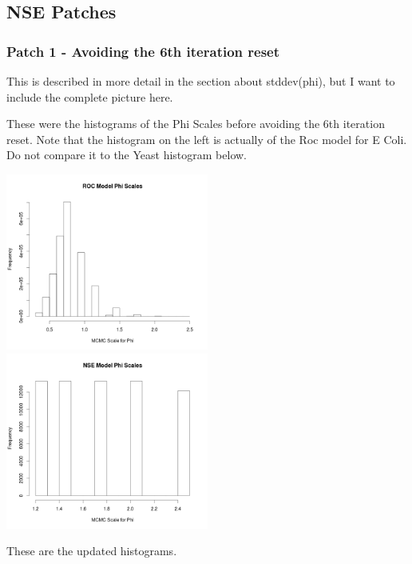 \subsection{NSE Patches}

\subsubsection{Patch 1 - Avoiding the 6th iteration reset}

This is described in more detail in the section about stddev(phi), but I want to include the complete picture here.

These were the histograms of the Phi Scales before avoiding the 6th iteration reset. Note that the histogram on the left is actually of the Roc model for E Coli. Do not compare it to the Yeast histogram below.

\includegraphics[width=0.5\textwidth]{data/oct10-roc-scalehist.png}
\includegraphics[width=0.5\textwidth]{data/oct10-nse-scalehist.png}


These are the updated histograms.

